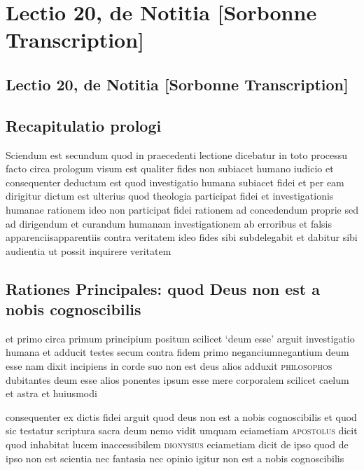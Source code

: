 \documentclass[twoside, openright]{report}
\newcommand{\name}[1]{\textsc{#1}}
\begin{document}
        \chapter*{Lectio 20, de Notitia [Sorbonne Transcription]}
        
         
        \beginnumbering
         \section*{Lectio 20, de Notitia [Sorbonne Transcription]} 
        \bigskip
         \section*{Recapitulatio prologi} 
        \pstart
        Sciendum est secundum quod in praecedenti lectione dicebatur in toto processu facto circa prologum visum est qualiter fides non subiacet humano iudicio et consequenter deductum est quod investigatio humana subiacet fidei et per eam dirigitur dictum est ulterius quod theologia participat fidei et investigationis humanae rationem ideo non participat fidei rationem ad concedendum proprie sed ad dirigendum et curandum humanam investigationem ab erroribus et falsis apparenciisapparentiis contra veritatem ideo fides sibi subdelegabit et dabitur sibi audientia ut possit inquirere veritatem
        \pend
      
        \bigskip
         \section*{Rationes Principales: quod Deus non est a nobis cognoscibilis} 
        \bigskip
         
        \pstart
        et primo circa primum principium positum scilicet \enquote*{deum esse} arguit investigatio humana et adducit testes secum contra fidem primo neganciumnegantium deum esse nam dixit incipiens  in corde suo non est deus alios adduxit \name{philosophos}\index[persons]{} dubitantes deum esse alios ponentes ipsum esse mere corporalem scilicet caelum et astra et huiusmodi
        \pend
     
        \pstart
        consequenter ex dictis fidei arguit quod deus non est a nobis cognoscibilis et quod sic testatur scriptura sacra deum nemo vidit umquam eciametiam \name{apostolus} dicit quod inhabitat lucem inaccessibilem \name{dionysius}\index[persons]{} eciametiam dicit de ipso quod de ipso non est scientia nec fantasia nec opinio igitur non est a nobis cognoscibilis
        \pend
      
\end{document}
